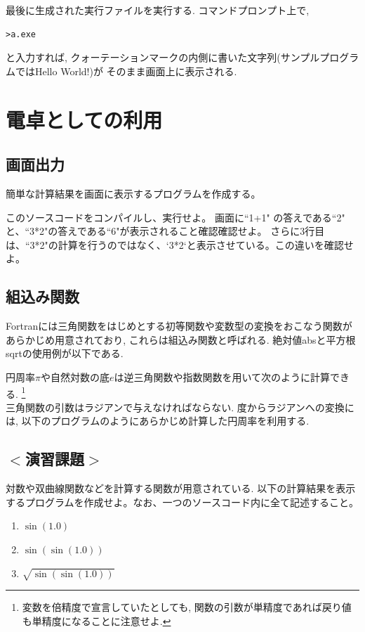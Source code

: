 \documentclass[a4j]{jsbook}
\begin{document}
最後に生成された実行ファイルを実行する. コマンドプロンプト上で,
\begin{Verbatim}[frame=single]
>a.exe
\end{Verbatim}
と入力すれば, クォーテーションマークの内側に書いた文字列(サンプルプログラムではHello World!)が
そのまま画面上に表示される.

\section{電卓としての利用}
\subsection*{画面出力}
簡単な計算結果を画面に表示するプログラムを作成する。

このソースコードをコンパイルし、実行せよ。
画面に``1+1" の答えである``2" と、``3*2"の答えである``6"が表示されること確認確認せよ。
さらに3行目は、``3*2"の計算を行うのではなく、`3*2`と表示させている。この違いを確認せよ。


\subsection*{組込み関数}
Fortranには三角関数をはじめとする初等関数や変数型の変換をおこなう関数があらかじめ用意されており,
これらは組込み関数と呼ばれる.
絶対値absと平方根sqrtの使用例が以下である.


円周率$\pi$や自然対数の底$e$は逆三角関数や指数関数を用いて次のように計算できる.
\footnote{変数を倍精度で宣言していたとしても, 関数の引数が単精度であれば戻り値も単精度になることに注意せよ.} \\


三角関数の引数はラジアンで与えなければならない.
度からラジアンへの変換には, 以下のプログラムのようにあらかじめ計算した円周率を利用する.


\subsection*{$<$演習課題$>$}
対数や双曲線関数などを計算する関数が用意されている.
以下の計算結果を表示するプログラムを作成せよ。なお、一つのソースコード内に全て記述すること。
\begin{enumerate}
\item $\sin(1.0)$
\item $\sin(\sin(1.0))$
\item $\sqrt{\sin(\sin(1.0))}$
\end{enumerate}
\end{document}
